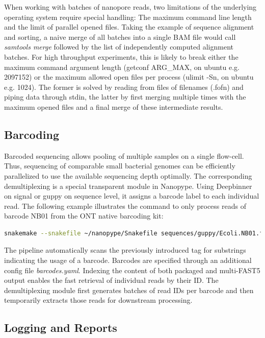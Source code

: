 When working with batches of nanopore reads, two limitations of the underlying operating system require special handling: The maximum command line length and the limit of parallel opened files. Taking the example of sequence alignment and sorting, a naive merge of all batches into a single BAM file would call \textit{samtools merge} followed by the list of independently computed alignment batches. For high throughput experiments, this is likely to break either the maximum command argument length (getconf ARG\_MAX, on ubuntu e.g. 2097152) or the maximum allowed open files per process (ulimit -Sn, on ubuntu e.g. 1024). The former is solved by reading from files of filenames (.fofn) and piping data through stdin, the latter by first merging multiple times with the maximum opened files and a final merge of these intermediate results.


\subsection{Barcoding}
\label{subsec:nanopype:barcoding}
Barcoded sequencing allows pooling of multiple samples on a single flow-cell. Thus, sequencing of comparable small bacterial genomes can be efficiently parallelized to use the available sequencing depth optimally. The corresponding demultiplexing is a special transparent module in Nanopype. Using Deepbinner \cite{Wick2018} on signal or guppy on sequence level, it assigns a barcode label to each individual read.  The following example illustrates the command to only process reads of barcode NB01 from the ONT native barcoding kit:

\begin{lstlisting}[language=sh, caption=Nanopype demultiplexing]
snakemake --snakefile ~/nanopype/Snakefile sequences/guppy/Ecoli.NB01.fastq.gz
\end{lstlisting}

The pipeline automatically scans the previously introduced tag for substrings indicating the usage of a barcode. Barcodes are specified through an additional config file \textit{barcodes.yaml}.
Indexing the content of both packaged and multi-FAST5 output enables the fast retrieval of individual reads by their ID. The demultiplexing module first generates batches of read IDs per barcode and then temporarily extracts those reads for downstream processing.


\subsection{Logging and Reports}
\label{subsec:nanopype:logging}

